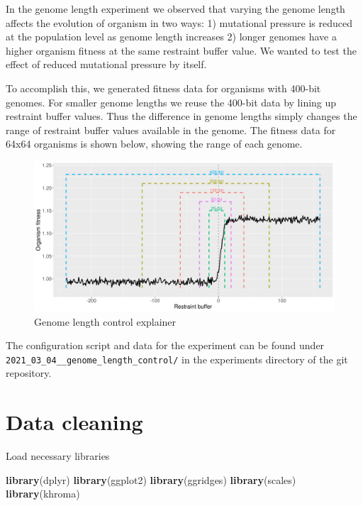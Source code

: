 \documentclass[]{book}
\newenvironment{Shaded}{\begin{snugshade}}{\end{snugshade}}
\newcommand{\KeywordTok}[1]{\textcolor[rgb]{0.13,0.29,0.53}{\textbf{#1}}}
\newcommand{\NormalTok}[1]{#1}
\begin{document}
In the genome length experiment we observed that varying the genome length affects the evolution of organism in two ways:
1) mutational pressure is reduced at the population level as genome length increases
2) longer genomes have a higher organism fitness at the same restraint buffer value.
We wanted to test the effect of reduced mutational pressure by itself.

To accomplish this, we generated fitness data for organisms with 400-bit genomes.
For smaller genome lengths we reuse the 400-bit data by lining up restraint buffer values.
Thus the difference in genome lengths simply changes the range of restraint buffer values available in the genome.
The fitness data for 64x64 organisms is shown below, showing the range of each genome.

\begin{figure}
\centering
\includegraphics{./genome_length_control/timing_control_explanation.png}
\caption{Genome length control explainer}
\end{figure}

The configuration script and data for the experiment can be found under \texttt{2021\_03\_04\_\_genome\_length\_control/} in the experiments directory of the git repository.

\hypertarget{data-cleaning-4}{%
\section{Data cleaning}\label{data-cleaning-4}}

Load necessary libraries

\begin{Shaded}
\begin{Highlighting}[]
\KeywordTok{library}\NormalTok{(dplyr)}
\KeywordTok{library}\NormalTok{(ggplot2)}
\KeywordTok{library}\NormalTok{(ggridges)}
\KeywordTok{library}\NormalTok{(scales)}
\KeywordTok{library}\NormalTok{(khroma)}
\end{Highlighting}
\end{Shaded}
\end{document}
